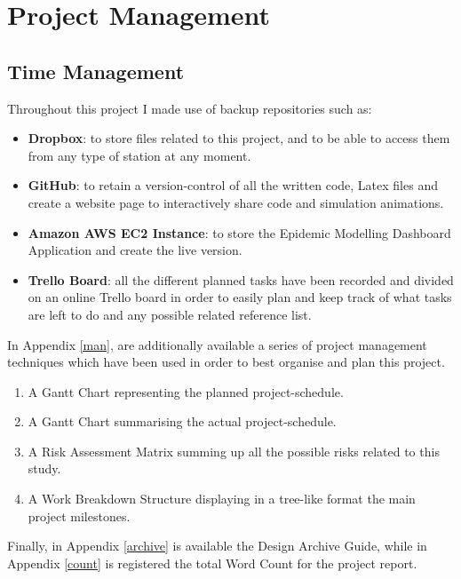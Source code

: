 \chapter{Project Management}

\label{ch:management}
\setlength\lineskip{0pt}
\vspace*{15pt}

\section{Time Management}
Throughout this project I made use of backup repositories such as:

\begin{itemize}
\itemsep0em
\item \textbf{Dropbox}: to store files related to this project, and to be able to access them from any type of station at any moment.
\item \textbf{GitHub}: to retain a version-control of all the written code, Latex files and create a website page to interactively share code and simulation animations.
\item \textbf{Amazon AWS EC2 Instance}: to store the Epidemic Modelling Dashboard Application and create the live version.
\item \textbf{Trello Board}: all the different planned tasks have been recorded and divided on an online Trello board in order to easily plan and keep track of what tasks are left to do and any possible related reference list.
\end{itemize}

In Appendix \ref{man}, are additionally available a series of project management techniques which have been used in order to best organise and plan this project.

\begin{enumerate}
\itemsep0em
\item A Gantt Chart representing the planned project-schedule.
\item A Gantt Chart summarising the actual project-schedule.
\item A Risk Assessment Matrix summing up all the possible risks related to this study.
\item A Work Breakdown Structure displaying in a tree-like format the main project milestones. 
\end{enumerate}

Finally, in Appendix \ref{archive} is available the Design Archive Guide, while in Appendix \ref{count} is registered the total Word Count for the project report.

